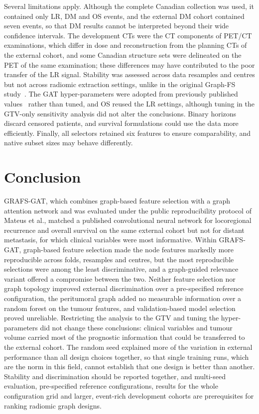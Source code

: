 \documentclass[11pt,a4paper]{article}
\newcommand{\method}{GRAFS-GAT}
\begin{document}
Several limitations apply. Although the complete Canadian collection was used, it contained only \eLRHNPET{} LR, \eDMHNPET{} DM and \eOSHNPET{} OS events, and the external DM cohort contained seven events, so that DM results cannot be interpreted beyond their wide confidence intervals. The development CTs were the CT components of PET/CT examinations, which differ in dose and reconstruction from the planning CTs of the external cohort, and some Canadian structure sets were delineated on the PET of the same examination; these differences may have contributed to the poor transfer of the LR signal. Stability was assessed across data resamples and centres but not across radiomic extraction settings, unlike in the original Graph-FS study~\cite{moradmand2025graphfs}. The GAT hyper-parameters were adopted from previously published values~\cite{bae2025spatial} rather than tuned, and OS reused the LR settings, although tuning in the GTV-only sensitivity analysis did not alter the conclusions. Binary horizons discard censored patients, and survival formulations could use the data more efficiently. Finally, all selectors retained six features to ensure comparability, and native subset sizes may behave differently.

\section{Conclusion}\label{sec:conclusion}
\method, which combines graph-based feature selection with a graph attention network and was evaluated under the public reproducibility protocol of Mateus et al., matched a published convolutional neural network for locoregional recurrence and overall survival on the same external cohort but not for distant metastasis, for which clinical variables were most informative. Within \method, graph-based feature selection made the node features markedly more reproducible across folds, resamples and centres, but the most reproducible selections were among the least discriminative, and a graph-guided relevance variant offered a compromise between the two. Neither feature selection nor graph topology improved external discrimination over a pre-specified reference configuration, the peritumoral graph added no measurable information over a random forest on the tumour features, and validation-based model selection proved unreliable. Restricting the analysis to the GTV and tuning the hyper-parameters did not change these conclusions: clinical variables and tumour volume carried most of the prognostic information that could be transferred to the external cohort. The random seed explained more of the variation in external performance than all design choices together, so that single training runs, which are the norm in this field, cannot establish that one design is better than another. Stability and discrimination should be reported together, and multi-seed evaluation, pre-specified reference configurations, results for the whole configuration grid and larger, event-rich development cohorts are prerequisites for ranking radiomic graph designs.
\end{document}
